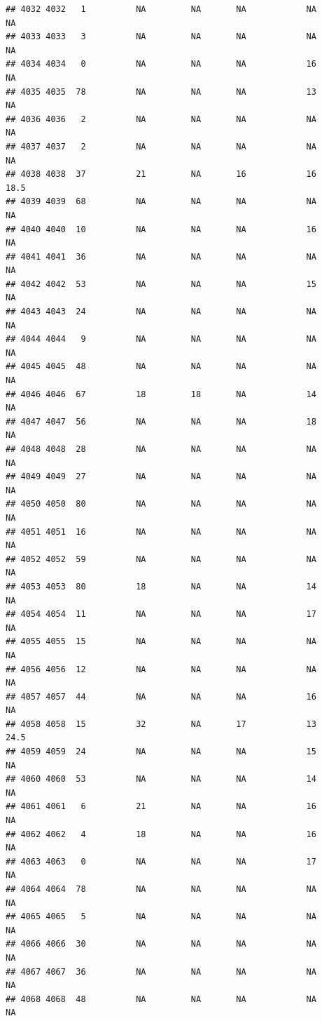 \documentclass[man]{apa6}
\begin{document}
\begin{verbatim}
## 4032 4032   1          NA         NA       NA            NA       NA
## 4033 4033   3          NA         NA       NA            NA       NA
## 4034 4034   0          NA         NA       NA            16       NA
## 4035 4035  78          NA         NA       NA            13       NA
## 4036 4036   2          NA         NA       NA            NA       NA
## 4037 4037   2          NA         NA       NA            NA       NA
## 4038 4038  37          21         NA       16            16     18.5
## 4039 4039  68          NA         NA       NA            NA       NA
## 4040 4040  10          NA         NA       NA            16       NA
## 4041 4041  36          NA         NA       NA            NA       NA
## 4042 4042  53          NA         NA       NA            15       NA
## 4043 4043  24          NA         NA       NA            NA       NA
## 4044 4044   9          NA         NA       NA            NA       NA
## 4045 4045  48          NA         NA       NA            NA       NA
## 4046 4046  67          18         18       NA            14       NA
## 4047 4047  56          NA         NA       NA            18       NA
## 4048 4048  28          NA         NA       NA            NA       NA
## 4049 4049  27          NA         NA       NA            NA       NA
## 4050 4050  80          NA         NA       NA            NA       NA
## 4051 4051  16          NA         NA       NA            NA       NA
## 4052 4052  59          NA         NA       NA            NA       NA
## 4053 4053  80          18         NA       NA            14       NA
## 4054 4054  11          NA         NA       NA            17       NA
## 4055 4055  15          NA         NA       NA            NA       NA
## 4056 4056  12          NA         NA       NA            NA       NA
## 4057 4057  44          NA         NA       NA            16       NA
## 4058 4058  15          32         NA       17            13     24.5
## 4059 4059  24          NA         NA       NA            15       NA
## 4060 4060  53          NA         NA       NA            14       NA
## 4061 4061   6          21         NA       NA            16       NA
## 4062 4062   4          18         NA       NA            16       NA
## 4063 4063   0          NA         NA       NA            17       NA
## 4064 4064  78          NA         NA       NA            NA       NA
## 4065 4065   5          NA         NA       NA            NA       NA
## 4066 4066  30          NA         NA       NA            NA       NA
## 4067 4067  36          NA         NA       NA            NA       NA
## 4068 4068  48          NA         NA       NA            NA       NA

\end{verbatim}
\end{document}
